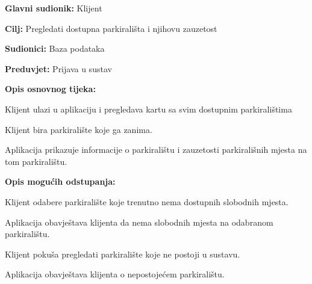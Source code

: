{\noindent {}
\begin{packed_item}
	
	\item \textbf{Glavni sudionik: }Klijent
	\item  \textbf{Cilj:} Pregledati dostupna parkirališta i njihovu zauzetost
	\item  \textbf{Sudionici:} Baza podataka
	\item  \textbf{Preduvjet:} Prijava u sustav
	\item  \textbf{Opis osnovnog tijeka:}
	
	\item[] \begin{packed_enum}
		
		\item Klijent ulazi u aplikaciju i pregledava kartu sa svim dostupnim parkiralištima
		\item Klijent bira parkiralište koje ga zanima.
		\item Aplikacija prikazuje informacije o parkiralištu i zauzetosti parkirališnih mjesta na tom parkiralištu.
		
	\end{packed_enum}
	
	\item  \textbf{Opis mogućih odstupanja:}
	
	\item[] \begin{packed_item}
		
		\item[2.a] Klijent odabere parkiralište koje trenutno nema dostupnih slobodnih mjesta.
		\item[] \begin{packed_enum}
			
			\item Aplikacija obavještava klijenta da nema slobodnih mjesta na odabranom parkiralištu.
			
		\end{packed_enum}
		\item[2.b] Klijent pokuša pregledati parkiralište koje ne postoji u sustavu.
		\item[] \begin{packed_enum}
			
			\item Aplikacija obavještava klijenta o nepostojećem parkiralištu.
			
		\end{packed_enum}
		

\end{packed_item}
\end{packed_item}}
